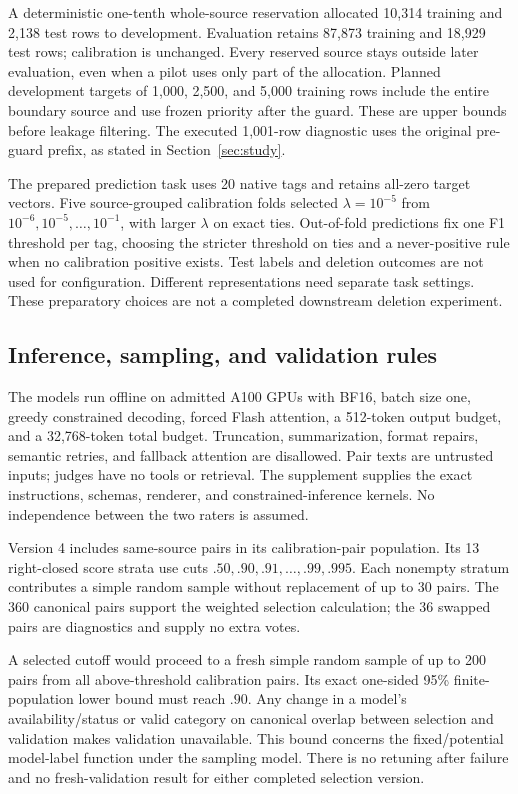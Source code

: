 A deterministic one-tenth whole-source reservation allocated 10,314
training and 2,138 test rows to development. Evaluation retains 87,873
training and 18,929 test rows; calibration is unchanged. Every reserved
source stays outside later evaluation, even when a pilot uses only part
of the allocation. Planned development targets of 1,000, 2,500, and 5,000
training rows include the entire boundary source and use frozen priority
after the guard. These are upper bounds before leakage filtering. The
executed 1,001-row diagnostic uses the original pre-guard prefix, as stated
in Section~\ref{sec:study}.

The prepared prediction task uses 20 native tags and retains all-zero
target vectors. Five source-grouped calibration folds selected
$\lambda=10^{-5}$ from $10^{-6},10^{-5},\ldots,10^{-1}$, with larger
$\lambda$ on exact ties. Out-of-fold predictions fix one F1 threshold per
tag, choosing the stricter threshold on ties and a never-positive rule
when no calibration positive exists. Test labels and deletion outcomes
are not used for configuration. Different representations need separate
task settings. These preparatory choices are not a completed downstream
deletion experiment.

\subsection{Inference, sampling, and validation rules}
The models run offline on admitted A100 GPUs with BF16, batch size one,
greedy constrained decoding, forced Flash attention, a 512-token output
budget, and a 32,768-token total budget. Truncation, summarization, format
repairs, semantic retries, and fallback attention are disallowed. Pair
texts are untrusted inputs; judges have no tools or retrieval. The
supplement supplies the exact instructions, schemas, renderer, and
constrained-inference kernels. No independence between the two raters is
assumed.

Version 4 includes same-source pairs in its calibration-pair population.
Its 13 right-closed score strata use cuts
$.50,.90,.91,\ldots,.99,.995$. Each nonempty stratum contributes a simple
random sample without replacement of up to 30 pairs. The 360 canonical
pairs support the weighted selection calculation; the 36 swapped pairs
are diagnostics and supply no extra votes.

A selected cutoff would proceed to a fresh simple random sample of up to
200 pairs from all above-threshold calibration pairs. Its exact one-sided
95\% finite-population lower bound must reach $.90$. Any change in a
model's availability/status or valid category on canonical overlap between
selection and validation makes validation unavailable. This bound concerns
the fixed/potential model-label function under the sampling model. There
is no retuning after failure and no fresh-validation result for either
completed selection version.

